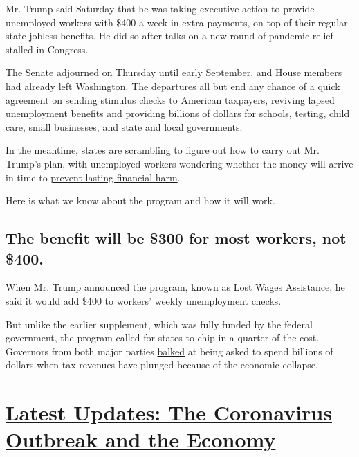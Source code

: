 Mr. Trump said Saturday that he was taking executive action to provide
unemployed workers with \$400 a week in extra payments, on top of their
regular state jobless benefits. He did so after talks on a new round of
pandemic relief stalled in Congress.

The Senate adjourned on Thursday until early September, and House
members had already left Washington. The departures all but end any
chance of a quick agreement on sending stimulus checks to American
taxpayers, reviving lapsed unemployment benefits and providing billions
of dollars for schools, testing, child care, small businesses, and state
and local governments.

In the meantime, states are scrambling to figure out how to carry out
Mr. Trump's plan, with unemployed workers wondering whether the money
will arrive in time to
\href{https://www.nytimes3xbfgragh.onion/2020/08/08/business/economy/lost-unemployment-benefits.html}{prevent
lasting financial harm}.

Here is what we know about the program and how it will work.

\hypertarget{the-benefit-will-be-300-for-most-workers-not-400}{%
\subsection{The benefit will be \$300 for most workers, not
\$400.}\label{the-benefit-will-be-300-for-most-workers-not-400}}

When Mr. Trump announced the program, known as Lost Wages Assistance, he
said it would add \$400 to workers' weekly unemployment checks.

But unlike the earlier supplement, which was fully funded by the federal
government, the program called for states to chip in a quarter of the
cost. Governors from both major parties
\href{https://www.nytimes3xbfgragh.onion/2020/08/10/us/politics/virus-stimulus-congress-trump.html}{balked}
at being asked to spend billions of dollars when tax revenues have
plunged because of the economic collapse.

\hypertarget{latest-updates-the-coronavirus-outbreak-and-the-economy}{%
\section{\texorpdfstring{\href{https://www.nytimes3xbfgragh.onion/live/2020/08/20/business/stock-market-today-coronavirus?action=click\&pgtype=Article\&state=default\&region=MAIN_CONTENT_1\&context=storylines_live_updates}{Latest
Updates: The Coronavirus Outbreak and the
Economy}}{Latest Updates: The Coronavirus Outbreak and the Economy}}\label{latest-updates-the-coronavirus-outbreak-and-the-economy}}

